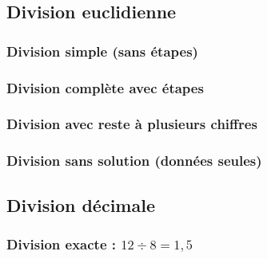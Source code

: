 \documentclass[11pt,a4paper]{article}
\begin{document}
\subsection{Division euclidienne}

\subsubsection{Division simple (sans étapes)}

\begin{center}
\division[dividende=1234, diviseur=56, solution]
\end{center}

\subsubsection{Division complète avec étapes}

\begin{center}
\division[dividende=1234, diviseur=56, solution, etapes={112, 112}]
\end{center}

\subsubsection{Division avec reste à plusieurs chiffres}

\begin{center}
\division[dividende=87765, diviseur=123, solution, etapes={861, 123, 369}]
\end{center}

\subsubsection{Division sans solution (données seules)}

\begin{center}
\division[dividende=1234, diviseur=56, etapes={112, 112}]
\end{center}

\subsection{Division décimale}

\subsubsection{Division exacte : $12 \div 8 = 1,5$}

\begin{center}
\division[dividende=12, diviseur=8, solution, decimales=1,
          etapes={8, 40}]
\end{center}
\end{document}

